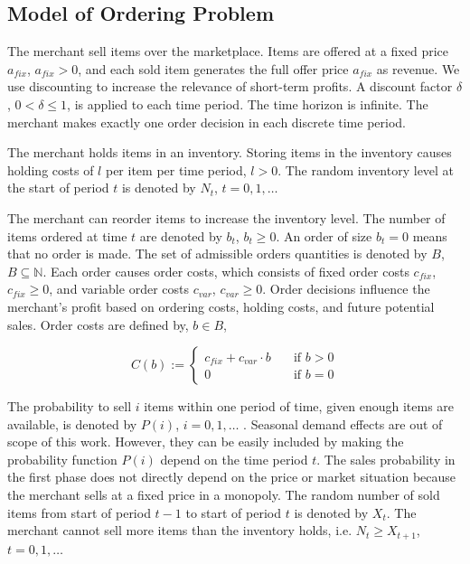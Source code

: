 \subsection{Model of Ordering Problem}
\label{subs:ordering_model}
The merchant sell items over the marketplace.
Items are offered at a fixed price $a_{fix}$, $a_{fix} > 0$, and each sold item generates the full offer price $a_{fix}$ as revenue.
We use discounting to increase the relevance of short-term profits.
A discount factor $\delta$, $0 < \delta \leq 1$, is applied to each time period.
The time horizon is infinite.
The merchant makes exactly one order decision in each discrete time period.

The merchant holds items in an inventory.
Storing items in the inventory causes holding costs of $l$ per item per time period, $l > 0$.
The random inventory level at the start of period $t$ is denoted by $N_t$, $t = 0, 1, \ldots$

The merchant can reorder items to increase the inventory level.
The number of items ordered at time $t$ are denoted by $b_t$, $b_t \geq 0$.
An order of size $b_t = 0$ means that no order is made.
The set of admissible orders quantities is denoted by $B$, $B \subseteq  \mathbb{N}$.
Each order causes order costs, which consists of fixed order costs $c_{fix}$, $c_{fix} \geq 0$, and variable order costs $c_{var}$, $c_{var} \geq 0$.
Order decisions influence the merchant's profit based on ordering costs, holding costs, and future potential sales.
Order costs are defined by, $b \in B$,

\begin{equation}
\label{eq:order_cost}
C(b) := \begin{cases}
	c_{fix} + c_{var} \cdot b  & \quad \text{if } b > 0 \\
	0  & \quad \text{if } b = 0
\end{cases}
\end{equation}

The probability to sell $i$ items within one period of time, given enough items are available, is denoted by $P(i)$, $i = 0, 1, \ldots$ .
Seasonal demand effects are out of scope of this work.
However, they can be easily included by making the probability function $P(i)$ depend on the time period $t$.
The sales probability in the first phase does not directly depend on the price or market situation because the merchant sells at a fixed price in a monopoly.
The random number of sold items from start of period $t-1$ to start of period $t$ is denoted by $X_t$.
The merchant cannot sell more items than the inventory holds, i.e. $N_t \geq X_{t+1}$, $t = 0, 1, \ldots$

